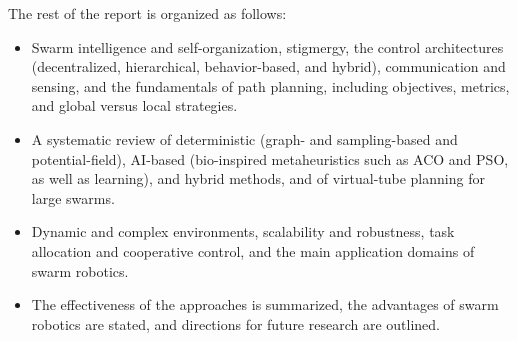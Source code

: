 The rest of the report is organized as follows:
\begin{itemize}
  \item {} Swarm intelligence and self-organization, stigmergy, the
        control architectures (decentralized, hierarchical, behavior-based, and
        hybrid), communication and sensing, and the fundamentals of path
        planning, including objectives, metrics, and global versus local
        strategies.
  \item {} A
        systematic review of deterministic (graph- and sampling-based and
        potential-field), AI-based (bio-inspired metaheuristics such as ACO and
        PSO, as well as learning), and hybrid methods, and of virtual-tube
        planning for large swarms.
  \item {} Dynamic and
        complex environments, scalability and robustness, task allocation and
        cooperative control, and the main application domains of swarm robotics.
  \item {} The
        effectiveness of the approaches is summarized, the advantages of swarm
        robotics are stated, and directions for future research are outlined.
\end{itemize}

